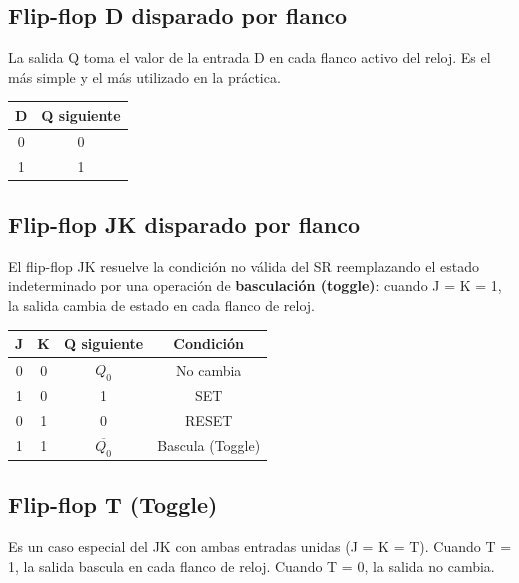 \subsection{Flip-flop D disparado por flanco}

La salida Q toma el valor de la entrada D en cada flanco activo del reloj. Es el más simple y el más utilizado en la práctica.

\begin{table}[H]
\centering
\begin{tabular}{cc}
\toprule
D & Q siguiente \\
\midrule
0 & 0 \\
1 & 1 \\
\bottomrule
\end{tabular}
\end{table}


\subsection{Flip-flop JK disparado por flanco}

El flip-flop JK resuelve la condición no válida del SR reemplazando el estado indeterminado por una operación de \textbf{basculación (toggle)}: cuando J = K = 1, la salida cambia de estado en cada flanco de reloj.

\begin{table}[H]
\centering
\begin{tabular}{cccc}
\toprule
J & K & Q siguiente & Condición \\
\midrule
0 & 0 & $Q_0$ & No cambia \\
1 & 0 & 1 & SET \\
0 & 1 & 0 & RESET \\
1 & 1 & $\overline{Q_0}$ & Bascula (Toggle) \\
\bottomrule
\end{tabular}
\end{table}


\subsection{Flip-flop T (Toggle)}

Es un caso especial del JK con ambas entradas unidas (J = K = T). Cuando T = 1, la salida bascula en cada flanco de reloj. Cuando T = 0, la salida no cambia.

